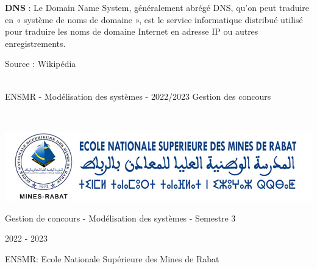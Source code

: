\noindent \textbf{DNS} : Le Domain Name System, généralement abrégé DNS, qu'on peut traduire en « système de noms de domaine », est le service informatique distribué utilisé pour traduire les noms de domaine Internet en adresse IP ou autres enregistrements.

\hfill Source : Wikipédia

\vfill
\noindent\makebox[\linewidth]{\rule{.8\paperwidth}{.6pt}}\\[0.2cm]
ENSMR - Modélisation des systèmes - 2022/2023 \hfill Gestion des concours
\noindent\makebox[\linewidth]{\rule{.8\paperwidth}{.6pt}}

\newpage
\thispagestyle{empty}
~
\vfill
\begin{center}
\includegraphics[width=1\textwidth]{img/logo-ensmr-2.jpg}

\large Gestion de concours - Modélisation des systèmes - Semestre 3


\large 2022 - 2023

\large ENSMR: Ecole Nationale Supérieure des Mines de Rabat
\end{center}
